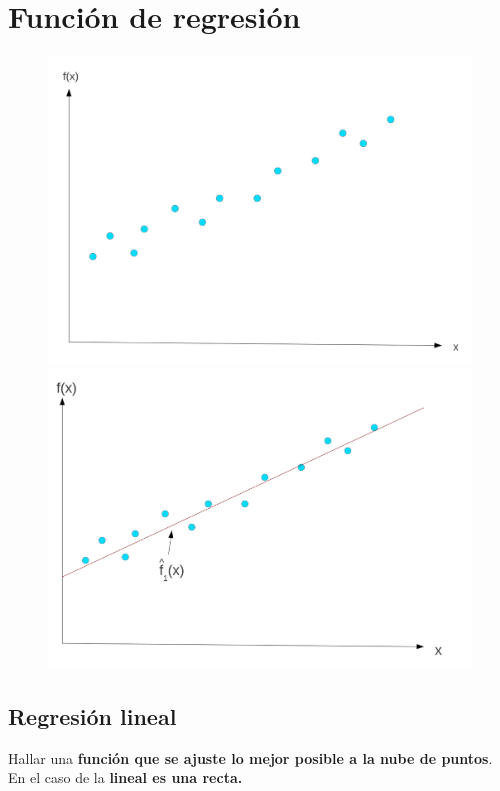 \documentclass[12pt, twoside, openright]{report} %
\begin{document}
\section{Función de regresión}
\begin{figure}[H]
	{\includegraphics[scale=.15]{image-20210305211354068.png}
	\includegraphics[scale=.15]{image-20210305211454026.png}}
\end{figure}

\subsection{Regresión lineal}

Hallar una \textbf{función que se ajuste lo mejor posible a la nube de
puntos}. En el caso de la \textbf{lineal es una recta.}
\end{document}
